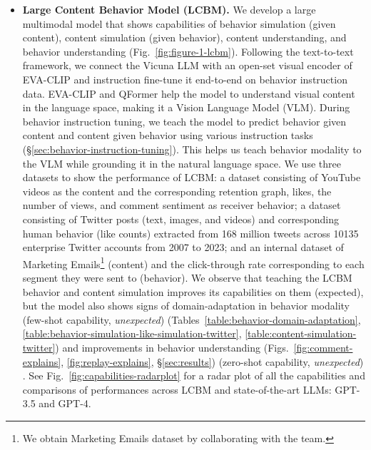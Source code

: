 \begin{itemize}[leftmargin=*]
    \item\textbf{Large Content Behavior Model (LCBM).} We develop a large multimodal model that shows capabilities of behavior simulation (given content), content simulation (given behavior), content understanding, and behavior understanding (Fig.~\ref{fig:figure-1-lcbm}). Following the text-to-text framework, we connect the Vicuna LLM \cite{touvron2023llama,vicuna2023} with an open-set visual encoder of EVA-CLIP \cite{sun2023eva} and instruction fine-tune it end-to-end on behavior instruction data. EVA-CLIP and QFormer \cite{li2023blip2} help the model to understand visual content in the language space, making it a Vision Language Model (VLM). During behavior instruction tuning, we teach the model to predict behavior given content and content given behavior using various instruction tasks (\S\ref{sec:behavior-instruction-tuning}). This helps us teach behavior modality to the VLM while grounding it in the natural language space. We use three datasets to show the performance of LCBM: a dataset consisting of YouTube videos as the content and the corresponding retention graph, likes, the number of views, and comment sentiment as receiver behavior; a dataset consisting of Twitter posts (text, images, and videos) and corresponding human behavior (like counts) extracted from 168 million tweets across 10135 enterprise Twitter accounts from 2007 to 2023; and an internal dataset of \companyName Marketing Emails\footnote[6]{We obtain \companyName Marketing Emails dataset by collaborating with the \companyName team.} (content) and the click-through rate corresponding to each segment they were sent to (behavior). We observe that teaching the LCBM behavior and content simulation improves its capabilities on them (expected), but the model also shows signs of domain-adaptation in behavior modality (few-shot capability, \textit{unexpected}) (Tables~\ref{table:behavior-domain-adaptation}, \ref{table:behavior-simulation-like-simulation-twitter}, \ref{table:content-simulation-twitter}) and improvements in behavior understanding (Figs.~\ref{fig:comment-explains}, \ref{fig:replay-explains}, \S\ref{sec:results}) (zero-shot capability, \textit{unexpected}) \cite{brown2020language}. See Fig.~\ref{fig:capabilities-radarplot} for a radar plot of all the capabilities and comparisons of performances across LCBM and state-of-the-art LLMs: GPT-3.5 and GPT-4.


\end{itemize}
